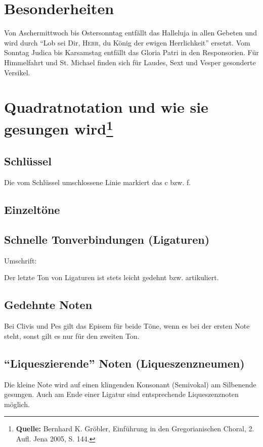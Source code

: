 \section*{Besonderheiten}
Von Aschermittwoch bis Ostersonntag entfällt das Halleluja in allen Gebeten und
wird durch \enquote{Lob sei Dir, \textsc{Herr}, du König der ewigen
Herrlichkeit} ersetzt. Vom Sonntag Judica bis Karsamstag entfällt das Gloria
Patri in den Responsorien. Für Himmelfahrt und St. Michael finden sich für
Laudes, Sext und Vesper gesonderte Versikel.
\section*{Quadratnotation und wie sie gesungen wird\protect\footnote{\textbf{Quelle:} Bernhard K. Gröbler, Einführung in den Gregorianischen Choral, 2. Aufl. Jena 2005, S. 144.}}
\subsection*{Schlüssel}
Die vom Schlüssel umschlossene Linie markiert das c bzw. f.
\subsection*{Einzeltöne}
\par
\subsection*{Schnelle Tonverbindungen (Ligaturen)}
Umschrift:\par
{%
\parindent 0pt
\ifx\preLilyPondExample \undefined
\else
  \expandafter\preLilyPondExample
\fi
\def\lilypondbook{}%

\ifx\postLilyPondExample \undefined
\else
  \expandafter\postLilyPondExample
\fi
}\par
Der letzte Ton von Ligaturen ist stets leicht gedehnt bzw. artikuliert.
\subsection*{Gedehnte Noten}
Bei Clivis und Pes gilt das Episem für beide Töne, wenn es bei der ersten Note
steht, sonst gilt es nur für den zweiten Ton.
\subsection*{\enquote{Liqueszierende} Noten (Liqueszenzneumen)}
Die kleine Note wird auf einen klingenden Konsonant (Semivokal) am Silbenende
gesungen. Auch am Ende einer Ligatur sind entsprechende Liqueszenznoten möglich.
